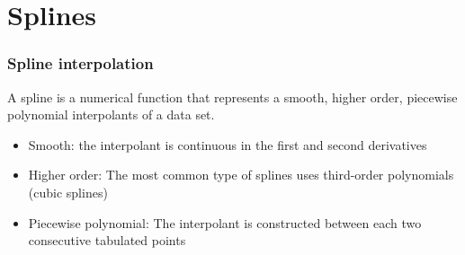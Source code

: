 \documentclass[11pt,table,final,fleqn,xcolor={usenames,dvipsnames,table}]{beamer}
\begin{document}
\section{Splines}
\begin{frame}
  \frametitle{Spline interpolation}
  A spline is a numerical function that represents a {\color{tuealert}smooth}, {\color{tuealert}higher order}, {\color{tuealert}piecewise polynomial} interpolants of a data set.
  \pause
  \begin{itemize}
     \item Smooth: the interpolant is continuous in the first and second derivatives 
     \item Higher order: The most common type of splines uses third-order polynomials (cubic splines)
     \item Piecewise polynomial: The interpolant is constructed between each two consecutive tabulated points
  \end{itemize}
\end{frame}
\end{document}
